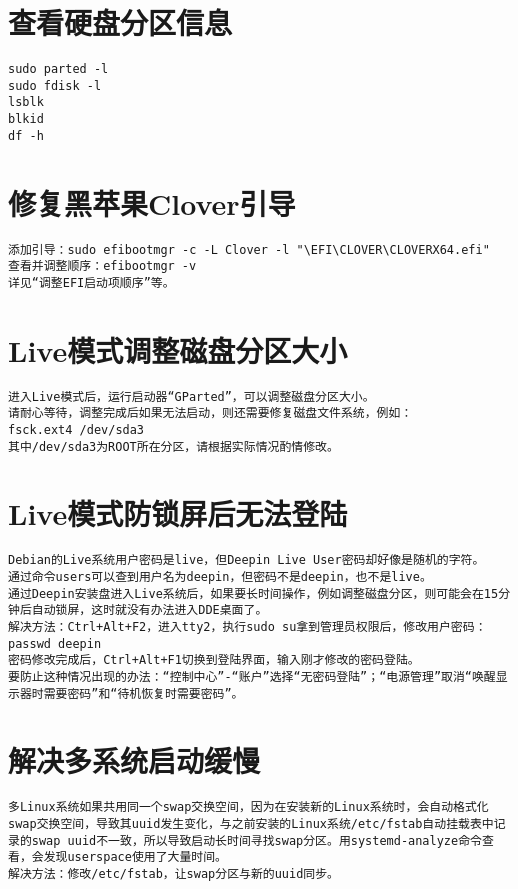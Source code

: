 \documentclass[a4paper,fontset=fandol,zihao=-4,linespread=1.2,oneside]{ctexbook}
\begin{document}
\section{查看硬盘分区信息}
\begin{lstlisting}
sudo parted -l
sudo fdisk -l
lsblk
blkid
df -h
\end{lstlisting}

\section{修复黑苹果Clover引导}
\begin{lstlisting}
添加引导：sudo efibootmgr -c -L Clover -l "\EFI\CLOVER\CLOVERX64.efi"
查看并调整顺序：efibootmgr -v
详见“调整EFI启动项顺序”等。
\end{lstlisting}

\section{Live模式调整磁盘分区大小}
\begin{lstlisting}
进入Live模式后，运行启动器“GParted”，可以调整磁盘分区大小。
请耐心等待，调整完成后如果无法启动，则还需要修复磁盘文件系统，例如：
fsck.ext4 /dev/sda3
其中/dev/sda3为ROOT所在分区，请根据实际情况酌情修改。
\end{lstlisting}

\section{Live模式防锁屏后无法登陆}
\begin{lstlisting}
Debian的Live系统用户密码是live，但Deepin Live User密码却好像是随机的字符。
通过命令users可以查到用户名为deepin，但密码不是deepin，也不是live。
通过Deepin安装盘进入Live系统后，如果要长时间操作，例如调整磁盘分区，则可能会在15分钟后自动锁屏，这时就没有办法进入DDE桌面了。
解决方法：Ctrl+Alt+F2，进入tty2，执行sudo su拿到管理员权限后，修改用户密码：
passwd deepin
密码修改完成后，Ctrl+Alt+F1切换到登陆界面，输入刚才修改的密码登陆。
要防止这种情况出现的办法：“控制中心”-“账户”选择“无密码登陆”；“电源管理”取消“唤醒显示器时需要密码”和“待机恢复时需要密码”。
\end{lstlisting}

\section{解决多系统启动缓慢}
\begin{lstlisting}
多Linux系统如果共用同一个swap交换空间，因为在安装新的Linux系统时，会自动格式化swap交换空间，导致其uuid发生变化，与之前安装的Linux系统/etc/fstab自动挂载表中记录的swap uuid不一致，所以导致启动长时间寻找swap分区。用systemd-analyze命令查看，会发现userspace使用了大量时间。
解决方法：修改/etc/fstab，让swap分区与新的uuid同步。
\end{lstlisting}
\end{document}
